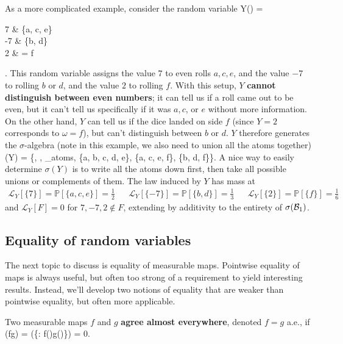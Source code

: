 \begin{example}
	As a more complicated example, consider the random variable
	\eq
		Y(\omega) = \begin{cases}
			7 & \omega\in \{a, c, e\} \\
			-7 & \omega\in \{b, d\} \\
			2 & \omega = f
		\end{cases}.
	\qe
	This random variable assigns the value $7$ to even rolls $a, c, e$, and the value $-7$ to rolling $b$ or $d$, and the value $2$ to rolling $f$. With this setup, $Y$ \textbf{cannot distinguish between even numbers}; it can tell us if a roll came out to be even, but it can't tell us specifically if it was $a, c$, or $e$ without more information. On the other hand, $Y$ can tell us if the dice landed on side $f$ (since $Y = 2$ corresponds to $\omega = f$), but can't distinguish between $b$ or $d$. $Y$ therefore generates the $\sigma$-algebra (note in this example, we also need to union all the atoms together)
	\eq
		\sigma(Y) = \{\emptyset, \Omega, _{\textnormal{atoms}}, \{a, b, c, d, e\}, \{a, c, e, f\}, \{b, d, f\}\}.
	\qe
	A nice way to easily determine $\sigma(Y)$ is to write all the atoms down first, then take all possible unions or complements of them. The law induced by $Y$ has mass at 
	\begin{align}
		\mathcal L_Y[\{7\}] = \mathbb P[\{a, c, e\}] = \frac{1}{2} && \mathcal L_Y[\{-7\}] = \mathbb P[\{b, d\}] = \frac{1}{3} && \mathcal L_Y[\{2\}] = \mathbb P[\{f\}] = \frac{1}{6}
	\end{align}
	and $\mathcal L_Y[F] = 0$ for $7, -7, 2\notin F$, extending by additivity to the entirety of $\sigma(\mathcal{B}_{1})$. 
\end{example}

\subsection{Equality of random variables}

The next topic to discuss is equality of measurable maps. Pointwise equality of maps is always useful, but often too strong of a requirement to yield interesting results. Instead, we'll develop two notions of equality that are weaker than pointwise equality, but often more applicable. 

\begin{definition}
	Two measurable maps $f$ and $g$ \textbf{agree almost everywhere}, denoted $f = g$ a.e., if
	\eq
		\mu(f\neq g) = \mu(\{\omega\in\Omega : f(\omega)\neq g(\omega)\}) = 0.
	\qe
\end{definition}

